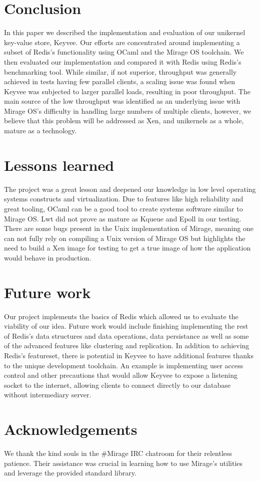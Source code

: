 \documentclass[english,10pt,twocolumn]{article}
\begin{document}
\section{Conclusion}
In this paper we described the implementation and evaluation of our unikernel key-value store, Keyvee.
Our efforts are concentrated around implementing a subset of Redis's functionality using OCaml and the Mirage OS toolchain.
We then evaluated our implementation and compared it with Redis using Redis's benchmarking tool.
While similar, if not superior, throughput was generally achieved in tests having few parallel clients, a scaling issue was found when Keyvee was subjected to larger parallel loads, resulting in poor throughput.
The main source of the low throughput was identified as an underlying issue with Mirage OS's difficulty in handling large numbers of multiple clients, however, we believe that this problem will be addressed as Xen, and unikernels as a whole, mature as a technology.

\section{Lessons learned}
The project was a great lesson and deepened our knowledge in low level operating systems constructs and virtualization.
Due to features like high reliability and great tooling, OCaml can be a good tool to create systems software similar to Mirage OS.
Lwt did not prove as mature as Kqueue and Epoll in our testing.
There are some bugs present in the Unix implementation of Mirage, meaning one can not fully rely on compiling a Unix version of Mirage OS but highlights the need to build a Xen image for testing to get a true image of how the application would behave in production.

\section{Future work}
Our project implements the basics of Redis which allowed us to evaluate the viability of our idea.
Future work would include finishing implementing the rest of Redis's data structures and data operations, data persistance as well as some of the advanced features like clustering and replication.
In addition to achieving Redis's featureset, there is potential in Keyvee to have additional features thanks to the unique development toolchain.
An example is implementing user access control and other precautions that would allow Keyvee to expose a listening socket to the internet, allowing clients to connect directly to our database without intermediary server.

\section{Acknowledgements}
We thank the kind souls in the \#Mirage IRC chatroom for their relentless patience.
Their assistance was crucial in learning how to use Mirage's utilities and leverage the provided standard library.





\end{document}
